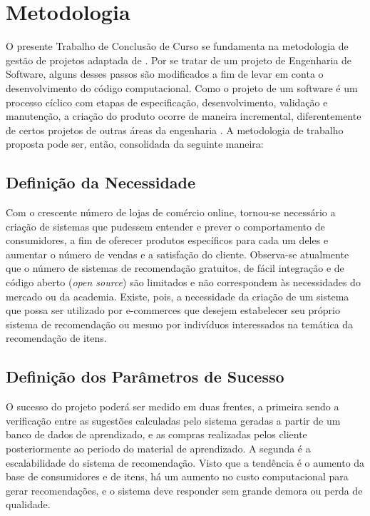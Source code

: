 \chapter[Metodologia]{Metodologia}
\label{chap:metodologia}

O presente Trabalho de Conclusão de Curso se fundamenta na metodologia de gestão de projetos adaptada de \cite{pmbok}. Por se tratar de um projeto de Engenharia de Software, alguns desses passos são modificados a fim de levar em conta o desenvolvimento do código computacional. Como o projeto de um software é um processo cíclico com etapas de especificação, desenvolvimento, validação e manutenção, a criação do produto ocorre de maneira incremental, diferentemente de certos projetos de outras áreas da engenharia \cite{iterative-development}. A metodologia de trabalho proposta pode ser, então, consolidada da seguinte maneira: 

\section{Definição da Necessidade} %
\label{sec:defini_o_da_necessidade}


Com o crescente número de lojas de comércio online, tornou-se necessário a criação de sistemas que pudessem entender e prever o comportamento de consumidores, a fim de oferecer produtos específicos para cada um deles e aumentar o número de vendas e a satisfação do cliente. Observa-se atualmente que o número de sistemas de recomendação gratuitos, de fácil integração e de código aberto (\textit{open source}) são limitados e não correspondem às necessidades do mercado ou da academia. Existe, pois, a necessidade da criação de um sistema que possa ser utilizado por e-commerces que desejem estabelecer seu próprio sistema de recomendação ou mesmo por indivíduos interessados na temática da recomendação de itens.

\section{Definição dos Parâmetros de Sucesso} %
\label{sec:defini_o_dos_par_metros_de_sucesso}


O sucesso do projeto poderá ser medido em duas frentes, a primeira sendo a verificação entre as sugestões calculadas pelo sistema geradas a partir de um banco de dados de aprendizado, e as compras realizadas pelos cliente posteriormente ao  periodo do material de aprendizado. A segunda é a escalabilidade do sistema de recomendação. Visto que a tendência é o aumento da base de consumidores e de itens, há um aumento no custo computacional para gerar recomendações, e o sistema deve responder sem grande demora ou perda de qualidade.

